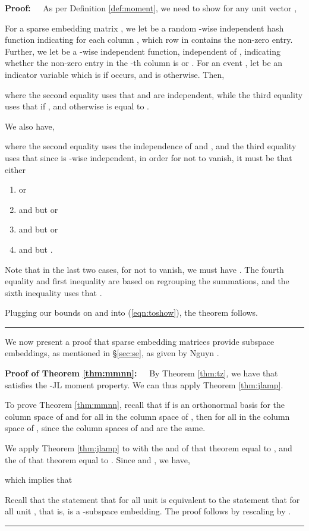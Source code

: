 \documentclass[11pt]{article}
\newenvironment{proof}{\begin{trivlist} \item {\bf Proof:~~}}
  {\qed\end{trivlist}}
\newenvironment{proofof}[1]{\begin{trivlist} \item {\bf Proof
#1:~~}}
  {\qed\end{trivlist}}
\def\qed{\hfill\rule{2mm}{2mm}}
\begin{document}
\begin{proof}
As per Definition \ref{def:moment}, we need to show for any unit vector ,

For a sparse embedding matrix , we let  be a random -wise independent 
hash function indicating for each column
, which row in  contains the non-zero entry. Further, we let  be a -wise
independent function, independent of , indicating whether
the non-zero entry in the -th column is  or . For an event , let  be an indicator variable
which is  if  occurs, and is  otherwise. Then,

where the second equality uses that  and  are independent, while the third equality uses that  if , and otherwise
is equal to . 

We also have,

where the second equality uses the independence of  and , and the third equality uses that since  is -wise independent, in order for 
 not to vanish, it must be that either 
\begin{enumerate}
\item  or
\item  and  but  or
\item  and  but  or
\item  and  but .
\end{enumerate}
Note that in the last two cases, for  not to vanish,
we must have . The fourth equality and first inequality are based on regrouping the summations, and the sixth inequality uses that . 

Plugging our bounds on  and  into (\ref{eqn:toshow}), the theorem follows. 
\end{proof}
We now present a proof that sparse embedding matrices provide subspace embeddings, as mentioned in \S\ref{sec:se},
as given by Nguyn \cite{n13}.  
\begin{proofof}{of Theorem \ref{thm:mmnn}}
By Theorem \ref{thm:tz}, we have that  satisfies the -JL moment property. We can thus apply Theorem \ref{thm:jlamp}. 

To prove Theorem \ref{thm:mmnn}, 
recall that 
if  is an orthonormal basis for the column space of  and  for all  in
the column space of , then  for all  in the column space of , since the column
spaces of  and  are the same. 

We apply Theorem \ref{thm:jlamp} to  with the  and  of that theorem equal to , 
and the  of that theorem equal to . Since  and , we have,

which implies that  

Recall that 
the statement that  for all unit  is
equivalent to the statement that  for all unit , that is,
 is a  -subspace embedding. The proof follows by rescaling  by .  
\end{proofof}
\end{document}
